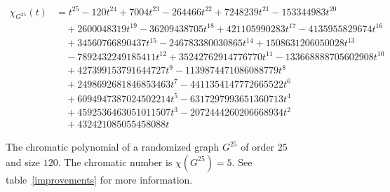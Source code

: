 \documentclass{cslthse-msc}
\begin{document}
\begin{appendices}
 \begin{figure}[h]
  \begin{equation*}
   \begin{split}
     \chi_{G^{25}}(t) & = t^{25} -120t^{24} + 7004t^{23} -264466t^{22} + 7248239t^{21} - 153344983t^{20} \\
     & \quad  + 2600048319t^{19} - 36209438705t^{18} + 421105990283t^{17} - 4135955829674t^{16} \\
     & \quad  + 34560766890437t^{15} - 246783380030865t^{14} + 1508631206050028t^{13} \\
     & \quad  - 7892432249185411t^{12} + 35242762914776770t^{11} - 133668888705602908t^{10} \\
     & \quad  + 427399153791644727t^{9} - 1139874471086088779t^8 \\
     & \quad  + 2498692681846853463t^7 - 4411354147772665522t^6 \\
     & \quad  + 6094947387024502214t^5 - 6317297993651360713t^4 \\
     & \quad  + 4592536463051011507t^3 - 2072444260206668934t^2 \\
     & \quad  + 432421085055458088t
   \end{split}
  \end{equation*}
  \caption{The chromatic polynomial of a randomized graph $G^{25}$ of order $25$ and size $120$. The chromatic number is $\chi(G^{25}) = 5$. See table~\ref{improvements} for more information.}
  \label{g25}
 \end{figure}
 

\end{appendices}
\end{document}
